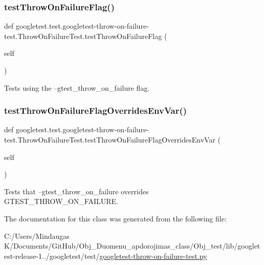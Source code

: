 \subsubsection{\texorpdfstring{testThrowOnFailureFlag()}{testThrowOnFailureFlag()}}
{\footnotesize\ttfamily def googletest.\+test.\+googletest-\/throw-\/on-\/failure-\/test.\+Throw\+On\+Failure\+Test.\+test\+Throw\+On\+Failure\+Flag (\begin{DoxyParamCaption}\item[{}]{self }\end{DoxyParamCaption})}

\begin{DoxyVerb}Tests using the --gtest_throw_on_failure flag.\end{DoxyVerb}
 \mbox{\label{classgoogletest_1_1test_1_1googletest-throw-on-failure-test_1_1_throw_on_failure_test_a84782c0236e19c48f37c08adb272f53a}} 
\subsubsection{\texorpdfstring{testThrowOnFailureFlagOverridesEnvVar()}{testThrowOnFailureFlagOverridesEnvVar()}}
{\footnotesize\ttfamily def googletest.\+test.\+googletest-\/throw-\/on-\/failure-\/test.\+Throw\+On\+Failure\+Test.\+test\+Throw\+On\+Failure\+Flag\+Overrides\+Env\+Var (\begin{DoxyParamCaption}\item[{}]{self }\end{DoxyParamCaption})}

\begin{DoxyVerb}Tests that --gtest_throw_on_failure overrides GTEST_THROW_ON_FAILURE.\end{DoxyVerb}
 

The documentation for this class was generated from the following file\+:\begin{DoxyCompactItemize}
\item 
C\+:/\+Users/\+Mindaugas K/\+Documents/\+Git\+Hub/\+Obj\+\_\+\+Duomenu\+\_\+apdorojimas\+\_\+class/\+Obj\+\_\+test/lib/googletest-\/release-\/1../googletest/test/\mbox{\hyperlink{_obj__test_2lib_2googletest-release-1_88_81_2googletest_2test_2googletest-throw-on-failure-test_8py}{googletest-\/throw-\/on-\/failure-\/test.\+py}}\end{DoxyCompactItemize}
